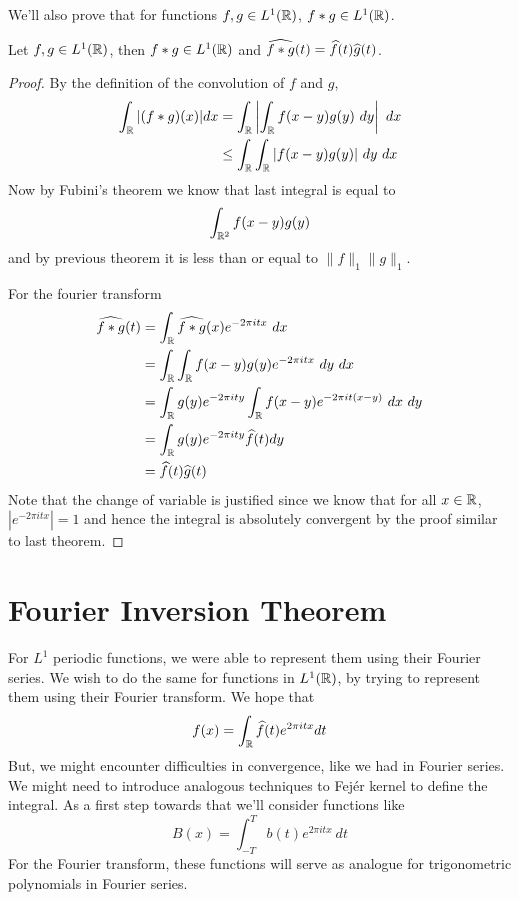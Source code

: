   We'll also prove that for functions $f, g \in L^1(\mathbb R)$, $f*g \in L^1(\mathbb R)$.
  \begin{proposition}
    \label{prop:convolution_is_well_defined_in_L^1(R)}
    Let $f, g \in L^1(\mathbb R)$, then $f*g \in L^1(\mathbb R)$ and $\widehat{f*g}(t) = \widehat{f}(t)\widehat{g}(t)$.
  \end{proposition}
  \begin{proof}
    By the definition of the convolution of $f$ and $g$, 
    \begin{align*}
      \int_\mathbb R|(f*g)(x)| dx &= \int_\mathbb R \left| \int_\mathbb R f(x-y)g(y) \ dy \right| \ dx \\
      & \le \int_\mathbb R \int_\mathbb R |f(x-y)g(y)| \ dy \ dx
    \end{align*}
    Now by Fubini's theorem we know that last integral is equal to $$\int_{\mathbb R^2}f(x-y)g(y) $$ and by previous theorem it is less than or equal to $\|f\|_1\|g\|_1$.

    For the fourier transform
    \begin{align*}
      \widehat{f*g}(t) &= \int_\R \widehat{f*g}(x) e^{-2 \pi itx} \ dx \\
      &= \int_\R \int_\R f(x-y)g(y) e^{-2 \pi itx} \ dy \ dx \\
      &= \int_\R g(y)e^{-2 \pi ity}\int_\R f(x-y) e^{-2 \pi it (x-y)} \ dx \ dy \\
      &= \int_\R g(y)e^{-2 \pi ity} \hatf(t) dy \\
      &= \hatf(t) \hatg(t) \\
    \end{align*}
    Note that the change of variable is justified since we know that  for all $x \in \mathbb R$, $|e^{-2\pi itx}| = 1$ and hence the integral is absolutely convergent by the proof similar to last theorem. 
  \end{proof}

\section{Fourier Inversion Theorem}
For $L^1$ periodic functions, we were able to represent them using their Fourier series. We wish to do the same for functions in $L^1(\mathbb R)$, by trying to represent them using their Fourier transform. We hope that $$f(x) = \int_\mathbb R \widehat{f}(t) e^{2\pi itx} dt$$
But, we might encounter difficulties in convergence, like we had in Fourier series. We might need to introduce analogous techniques to Fej\'er kernel to define the integral. As a first step towards that we'll consider functions like $$B(x) = \int_{-T}^T b(t)e^{2 \pi itx} \ dt$$
For the Fourier transform, these functions will serve as analogue for trigonometric polynomials in Fourier series.

